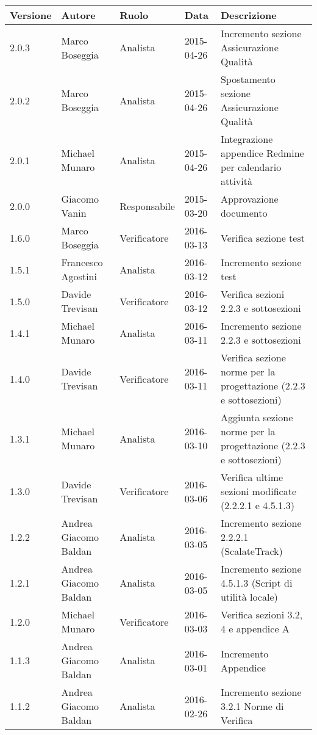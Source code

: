 \documentclass{scalatekids-article}
\begin{document}
\begin{center}
  \begin{longtable}{| l | l | l | l | p{5cm} |}
    \hline
    Versione & Autore & Ruolo & Data & Descrizione \\
    \hline
    2.0.3 & Marco Boseggia & Analista & 2015-04-26 & Incremento sezione Assicurazione Qualità \\
    \hline
    2.0.2 & Marco Boseggia & Analista & 2015-04-26 & Spostamento sezione Assicurazione Qualità \\
    \hline
    2.0.1 & Michael Munaro & Analista & 2015-04-26 & Integrazione appendice Redmine per calendario attività \\
    \hline
    2.0.0 & Giacomo Vanin & Responsabile & 2015-03-20 & Approvazione documento\\
    \hline
    1.6.0 & Marco Boseggia & Verificatore & 2016-03-13 & Verifica sezione test\\
    \hline
    1.5.1 & Francesco Agostini & Analista & 2016-03-12 & Incremento sezione test\\
    \hline
    1.5.0 & Davide Trevisan & Verificatore & 2016-03-12 & Verifica sezioni 2.2.3 e sottosezioni\\
    \hline
    1.4.1 & Michael Munaro & Analista & 2016-03-11 & Incremento sezione 2.2.3 e sottosezioni\\
    \hline
    1.4.0 & Davide Trevisan & Verificatore & 2016-03-11 & Verifica sezione norme per la progettazione (2.2.3 e sottosezioni)\\
    \hline
    1.3.1 & Michael Munaro & Analista & 2016-03-10 & Aggiunta sezione norme per la progettazione (2.2.3 e sottosezioni)\\
    \hline
    1.3.0 & Davide Trevisan & Verificatore & 2016-03-06 & Verifica ultime sezioni modificate (2.2.2.1 e 4.5.1.3)\\
    \hline
    1.2.2 & Andrea Giacomo Baldan & Analista & 2016-03-05 & Incremento sezione 2.2.2.1 (ScalateTrack)\\
    \hline
    1.2.1 & Andrea Giacomo Baldan & Analista & 2016-03-05 & Incremento sezione 4.5.1.3 (Script di utilità locale)\\
    \hline
    1.2.0 & Michael Munaro & Verificatore & 2016-03-03 & Verifica sezioni 3.2, 4 e appendice A \\
    \hline
    1.1.3 & Andrea Giacomo Baldan & Analista & 2016-03-01 & Incremento Appendice\\
    \hline
    1.1.2 & Andrea Giacomo Baldan & Analista & 2016-02-26 & Incremento sezione 3.2.1 Norme di Verifica\\

\end{longtable}
\end{center}
\end{document}
